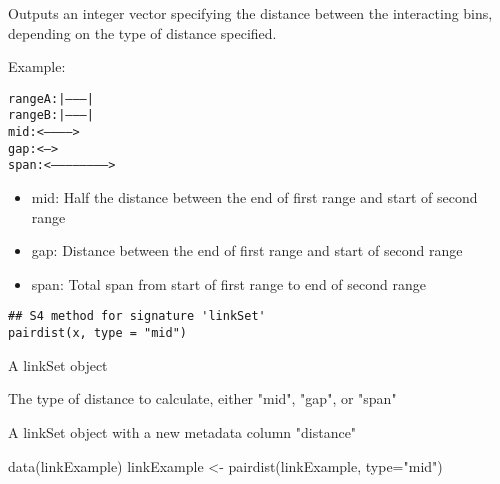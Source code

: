 \documentclass[letterpaper]{book}
\begin{document}
%
\begin{Description}
Outputs an integer vector specifying the distance between the interacting bins,
depending on the type of distance specified.

Example:

\begin{alltt}   rangeA:  |---------|
   rangeB:                |---------|
   mid:           <----------->
   gap:               <-->
   span:    <----------------------->
\end{alltt}

\begin{itemize}

\item{} mid: Half the distance between the end of first range and start of second range
\item{} gap: Distance between the end of first range and start of second range
\item{} span: Total span from start of first range to end of second range

\end{itemize}

\end{Description}
%
\begin{Usage}
\begin{verbatim}
## S4 method for signature 'linkSet'
pairdist(x, type = "mid")
\end{verbatim}
\end{Usage}
%
\begin{Arguments}
\begin{ldescription}
\item[\code{x}] A linkSet object

\item[\code{type}] The type of distance to calculate, either "mid", "gap", or "span"
\end{ldescription}
\end{Arguments}
%
\begin{Value}
A linkSet object with a new metadata column "distance"
\end{Value}
%
\begin{Examples}
\begin{ExampleCode}
data(linkExample)
linkExample <- pairdist(linkExample, type="mid")

\end{ExampleCode}
\end{Examples}
\end{document}
